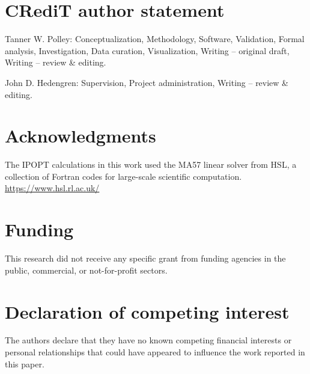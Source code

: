     \section*{CRediT author statement}
        Tanner W. Polley: Conceptualization, Methodology, Software, Validation, Formal analysis, Investigation, Data curation, Visualization, Writing -- original draft, Writing -- review \& editing.

        John D. Hedengren: Supervision, Project administration, Writing -- review \& editing.

    \section*{Acknowledgments}
        The IPOPT calculations in this work used the MA57 linear solver from HSL, a collection of Fortran codes for large-scale scientific computation. \url{https://www.hsl.rl.ac.uk/}

    \section*{Funding}
        This research did not receive any specific grant from funding agencies in the public, commercial, or not-for-profit sectors.

    \section*{Declaration of competing interest}
        The authors declare that they have no known competing financial interests or personal relationships that could have appeared to influence the work reported in this paper.
